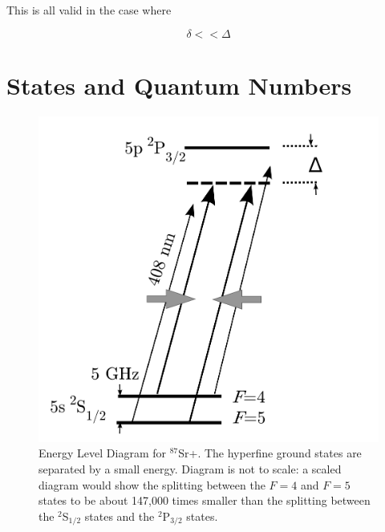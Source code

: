 This is all valid in the case where 

\begin{equation}
\delta<<\Delta
\end{equation}



\section{States and Quantum Numbers}

\begin{figure}
\centerline{
\includegraphics[totalheight=0.3\textheight]{E_level_from_proposal}
}
\caption[Energy Level Diagram for $^{87}$Sr+]{Energy Level Diagram for $^{87}$Sr+. The hyperfine ground states are separated by a small energy. Diagram is not to scale: a scaled diagram would show the splitting between the $F=4$ and $F=5$ states to be about 147,000 times smaller than the splitting between the $^2$S$_{1/2}$ states and the $^2$P$_{3/2}$ states.}
\end{figure}

